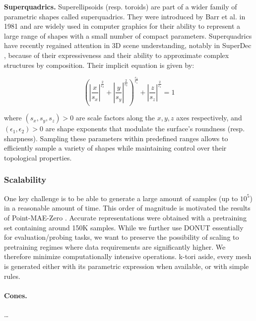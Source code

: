 \textbf{Superquadrics.} Superellipsoids  (resp. toroids) are part of a wider family of parametric shapes called superquadrics. They were introduced by Barr et al. \cite{superquadrics} in 1981 and are widely used in computer graphics for their ability to represent a large range of shapes with a small number of compact parameters. Superquadrics have recently regained attention in 3D scene understanding, notably in SuperDec \cite{superdec}, because of their expressiveness and their ability to approximate complex structures by composition. Their implicit equation is given by:

\begin{equation}
\left( \left| \frac{x}{s_x} \right|^{\tfrac{2}{\epsilon_2}}
     + \left| \frac{y}{s_y} \right|^{\tfrac{2}{\epsilon_2}} \right)^{\tfrac{\epsilon_2}{\epsilon_1}}
+ \left| \frac{z}{s_z} \right|^{\tfrac{2}{\epsilon_1}}
= 1
\end{equation}

where $(s_x, s_y, s_z) > 0$ are scale factors along the $x, y, z$ axes respectively, and $(\epsilon_1, \epsilon_2) > 0$ are shape exponents that modulate the surface's roundness (resp. sharpness). Sampling these parameters within predefined ranges allows to efficiently sample a variety of shapes while maintaining control over their topological properties.

\subsubsection{Scalability}
\label{sssec:mesh-generation}

One key challenge is to be able to generate a large amount of samples (up to $10^5$) in a reasonable amount of time. This order of magnitude is motivated the results of Point-MAE-Zero \cite{pmaezero}. Accurate representations were obtained with a pretraining set containing around 150K samples. While we further use DONUT essentially for evaluation/probing tasks, we want to preserve the possibility of scaling to pretraining regimes where data requirements are significantly higher. We therefore minimize computationally intensive operations. k-tori aside, every mesh is generated either with its parametric expression when available, or with simple rules.

\paragraph{Cones.} \dots

